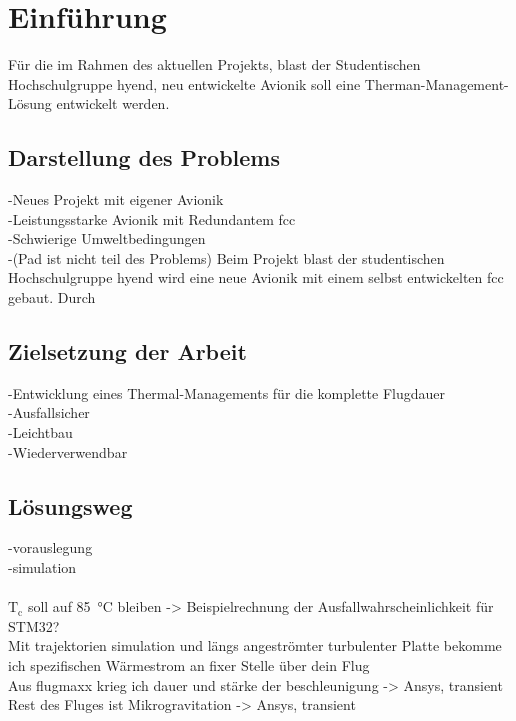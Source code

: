 \chapter{Einführung}			
\label{sec:Introduction}


Für die im Rahmen des aktuellen Projekts, \ac{blast} der Studentischen Hochschulgruppe \ac{hyend}, neu entwickelte Avionik soll eine Therman-Management-Lösung entwickelt werden.

\section{Darstellung des Problems}

-Neues Projekt mit eigener Avionik\\
-Leistungsstarke Avionik mit Redundantem \ac{fcc}\\
-Schwierige Umweltbedingungen\\
-(Pad ist nicht teil des Problems)
\newline
Beim Projekt \ac{blast} der studentischen Hochschulgruppe \ac{hyend} wird eine neue Avionik mit einem selbst entwickelten \ac{fcc} gebaut. Durch 

\section{Zielsetzung der Arbeit}

-Entwicklung eines Thermal-Managements für die komplette Flugdauer\\
-Ausfallsicher\\
-Leichtbau\\
-Wiederverwendbar

\section{Lösungsweg}

-vorauslegung\\
-simulation\\
\cite{Claudio-2018, Ho-2021, Isaacs-2017, Abdel-2024, Xu-2022, Pavia-2015, Yang-2015, ST-guide, NASA-2023, Gilmore-2002, Hume-2022}\\
$\mathrm{T_c}$ soll auf \SI{85}{\celsius} bleiben -> Beispielrechnung der Ausfallwahrscheinlichkeit für STM32?\\
Mit trajektorien simulation und längs angeströmter turbulenter Platte bekomme ich spezifischen Wärmestrom an fixer Stelle über dein Flug\\
Aus flugmaxx krieg ich dauer und stärke der beschleunigung -> Ansys, transient\\
Rest des Fluges ist Mikrogravitation -> Ansys, transient\\